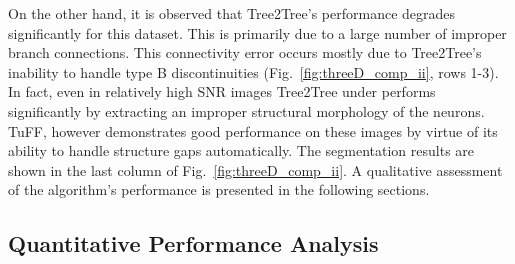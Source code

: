 On the other hand, it is observed that Tree2Tree's performance degrades significantly for this dataset. This is primarily due to a large number of improper branch connections. This connectivity error occurs mostly due to Tree2Tree's inability to handle type B discontinuities (Fig.~\ref{fig:threeD_comp_ii}, rows 1-3). In fact, even in relatively high SNR images Tree2Tree under performs significantly by extracting an improper structural morphology of the neurons. TuFF, however demonstrates good performance on these images by virtue of its ability to handle structure gaps automatically. The segmentation results are shown in the last column of Fig.~\ref{fig:threeD_comp_ii}. A qualitative assessment of the algorithm's performance is presented in the following sections.


\subsection{Quantitative Performance Analysis}
